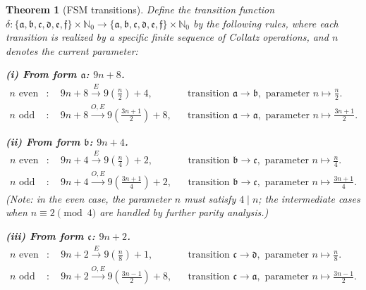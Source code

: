 \documentclass[11pt,a4paper]{article}
\theoremstyle{plain}
\newtheorem{theorem}{Theorem}[section]
\theoremstyle{definition}
\newcommand{\N}{\mathbb{N}}
\begin{document}
\begin{theorem}[FSM transitions]\label{thm:fsm_transitions}
  Define the transition function $\delta: \{\mathfrak{a}, \mathfrak{b}, \mathfrak{c}, \mathfrak{d}, \mathfrak{e}, \mathfrak{f}\} \times \N_0 \to \{\mathfrak{a}, \mathfrak{b}, \mathfrak{c}, \mathfrak{d}, \mathfrak{e}, \mathfrak{f}\} \times \N_0$ by the following rules, where each transition is realized by a specific finite sequence of Collatz operations, and $n$ denotes the current parameter:

  \medskip
  \noindent\textbf{(i) From form $\mathfrak{a}$: $9n+8$.}
  \begin{align}
    n \text{ even} &: \quad 9n+8 \xrightarrow{E} 9\!\left(\tfrac{n}{2}\right)+4, && \text{transition } \mathfrak{a} \to \mathfrak{b}, \text{ parameter } n \mapsto \tfrac{n}{2}. \label{eq:a_even} \\
    n \text{ odd} &: \quad 9n+8 \xrightarrow{O,E} 9\!\left(\tfrac{3n+1}{2}\right)+8, && \text{transition } \mathfrak{a} \to \mathfrak{a}, \text{ parameter } n \mapsto \tfrac{3n+1}{2}. \label{eq:a_odd}
  \end{align}

  \medskip
  \noindent\textbf{(ii) From form $\mathfrak{b}$: $9n+4$.}
  \begin{align}
    n \text{ even} &: \quad 9n+4 \xrightarrow{E} 9\!\left(\tfrac{n}{4}\right)+2, && \text{transition } \mathfrak{b} \to \mathfrak{c}, \text{ parameter } n \mapsto \tfrac{n}{4}. \label{eq:b_even} \\
    n \text{ odd} &: \quad 9n+4 \xrightarrow{O,E} 9\!\left(\tfrac{3n+1}{4}\right)+2, && \text{transition } \mathfrak{b} \to \mathfrak{c}, \text{ parameter } n \mapsto \tfrac{3n+1}{4}. \label{eq:b_odd}
  \end{align}
  (Note: in the even case, the parameter $n$ must satisfy $4 \mid n$; the intermediate cases when $n \equiv 2 \pmod{4}$ are handled by further parity analysis.)

  \medskip
  \noindent\textbf{(iii) From form $\mathfrak{c}$: $9n+2$.}
  \begin{align}
    n \text{ even} &: \quad 9n+2 \xrightarrow{E} 9\!\left(\tfrac{n}{8}\right)+1, && \text{transition } \mathfrak{c} \to \mathfrak{d}, \text{ parameter } n \mapsto \tfrac{n}{8}. \label{eq:c_even} \\
    n \text{ odd} &: \quad 9n+2 \xrightarrow{O,E} 9\!\left(\tfrac{3n-1}{2}\right)+8, && \text{transition } \mathfrak{c} \to \mathfrak{a}, \text{ parameter } n \mapsto \tfrac{3n-1}{2}. \label{eq:c_odd}
  \end{align}


\end{theorem}
\end{document}
